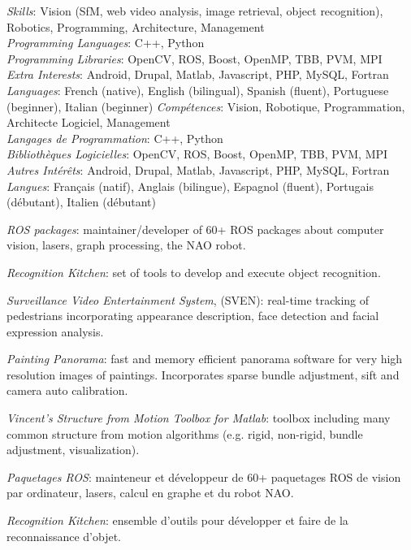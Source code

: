 \documentclass{article}
\begin{document}
\begin{llist}
{
{\em Skills}: Vision (SfM, web video analysis, image retrieval, object recognition), Robotics, Programming, Architecture, Management \\
{\em Programming Languages}: C++, Python\\
{\em Programming Libraries}: OpenCV, ROS, Boost, OpenMP, TBB, PVM, MPI \\
{\em Extra Interests}: Android, Drupal, Matlab, Javascript, PHP, MySQL, Fortran \\
{\em Languages}: French (native), English (bilingual), Spanish (fluent), Portuguese (beginner), Italian (beginner)
}
{
{\em Comp\'{e}tences}: Vision, Robotique, Programmation, Architecte Logiciel, Management\\
{\em Langages de Programmation}: C++, Python\\
{\em Biblioth\`{e}ques Logicielles}: OpenCV, ROS, Boost, OpenMP, TBB, PVM, MPI \\
{\em Autres Int\'{e}r\^{e}ts}: Android, Drupal, Matlab, Javascript, PHP, MySQL, Fortran \\
{\em Langues}: Fran\c{c}ais (natif), Anglais (bilingue), Espagnol (fluent), Portugais (d\'{e}butant), Italien
(d\'{e}butant)
}

{
{\em ROS packages}: maintainer/developer of 60+ ROS packages about computer vision, lasers, graph processing, the NAO robot.

{\em Recognition Kitchen}: set of tools to develop and execute object recognition.

{\em Surveillance Video Entertainment System}, (SVEN): real-time tracking of pedestrians incorporating appearance 
description, face detection and facial expression analysis.

{\em Painting Panorama}: fast and memory efficient panorama software for very high resolution images of paintings.  Incorporates sparse bundle adjustment, sift and camera auto calibration.

{\em Vincent's Structure from Motion Toolbox for Matlab}: toolbox including many common structure from motion algorithms 
(e.g. rigid, non-rigid, bundle adjustment, visualization).
}
{
{\em Paquetages ROS}: mainteneur et d\'{e}veloppeur de 60+ paquetages ROS de vision par ordinateur, lasers, calcul
en graphe et du robot NAO.

{\em Recognition Kitchen}: ensemble d'outils pour d\'{e}velopper et faire de la reconnaissance d'objet.

}
\end{llist}
\end{document}
